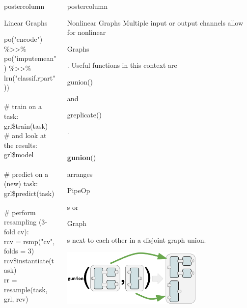 \documentclass{beamer}
\newlength{\columnheight} %
\newcommand{\codeinline}[1]{\begin{codeboxinline}#1\end{codeboxinline}}
\begin{document}
\begin{frame}[fragile]{}
\begin{columns}
\begin{column}{.245\textwidth}
\begin{beamercolorbox}[center]{postercolumn}
\begin{minipage}{.98\textwidth}
{\begin{myblock}{Linear Graphs}
\begin{codeboxexample}
{                  \hspace*{1ex} po("encode") \%>{}>\% po("imputemean") \%>{}>\%\\
                  \hspace*{1ex} lrn("classif.rpart"))\\
                  \ \\
                  \# train on a task:\\
                  grl\$train(task)\\
                  \# and look at the results:\\
                  grl\$model\\
                  \ \\
                  \# predict on a (new) task:\\
                  grl\$predict(task)\\
                  \ \\
                  \# perform resampling (3-fold cv):\\
                  rcv = rsmp("cv", folds = 3)\\
                  rcv\$instantiate(task)\\
                  rr = resample(task, grl, rcv)}
              \end{codeboxexample}
            \end{myblock}
				    \vfill}
				\end{minipage}
			\end{beamercolorbox}
		\end{column}
    \begin{column}{.245\textwidth}
			\begin{beamercolorbox}[center]{postercolumn}
				\begin{minipage}{.98\textwidth}
					\parbox[t][\columnheight]{\textwidth}{
             \begin{myblock}{Nonlinear Graphs}
              Multiple input or output channels allow for nonlinear \codeinline{Graphs}. Useful functions in this context are \codeinline{gunion()} and \codeinline{greplicate()}.\\
              \ \\
              \codeinline{\textbf{gunion}()} arranges \codeinline{PipeOp}s or \codeinline{Graph}s next to each other in a disjoint graph union.
              \begin{center}
                \includegraphics[width=0.7\textwidth]{img/gunion.pdf}

\end{center}
\end{myblock}}
\end{minipage}
\end{beamercolorbox}
\end{column}
\end{columns}
\end{frame}
\end{document}
